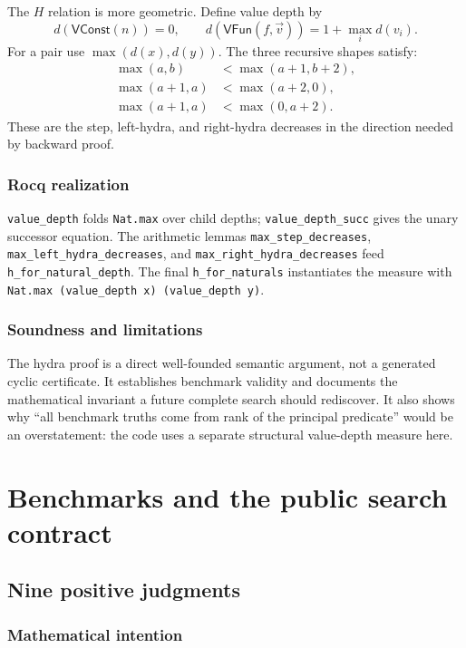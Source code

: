 \documentclass[11pt,oneside]{book}
\DeclareRobustCommand{\code}[1]{\nolinkurl{#1}}
\newcommand{\mathintent}{\subsection*{Mathematical intention}}
\newcommand{\rocqreal}{\subsection*{Rocq realization}}
\newcommand{\soundlim}{\subsection*{Soundness and limitations}}
\begin{document}
The \(H\) relation is more geometric.  Define value depth by
\[
 d(\mathsf{VConst}(n))=0,
 \qquad
 d(\mathsf{VFun}(f,\vec v))=1+\max_i d(v_i).
\]
For a pair use \(\max(d(x),d(y))\).  The three recursive shapes satisfy:
\[
\begin{aligned}
 \max(a,b)&<\max(a+1,b+2),\\
 \max(a+1,a)&<\max(a+2,0),\\
 \max(a+1,a)&<\max(0,a+2).
\end{aligned}
\]
These are the step, left-hydra, and right-hydra decreases in the direction
needed by backward proof.

\rocqreal

\code{value_depth} folds \code{Nat.max} over child depths;
\code{value_depth_succ} gives the unary successor equation.  The arithmetic
lemmas \code{max_step_decreases}, \code{max_left_hydra_decreases}, and
\code{max_right_hydra_decreases} feed
\code{h_for_natural_depth}.  The final \code{h_for_naturals} instantiates the
measure with \code{Nat.max (value_depth x) (value_depth y)}.

\soundlim

The hydra proof is a direct well-founded semantic argument, not a generated
cyclic certificate.  It establishes benchmark validity and documents the
mathematical invariant a future complete search should rediscover.  It also
shows why ``all benchmark truths come from rank of the principal predicate''
would be an overstatement: the code uses a separate structural value-depth
measure here.

\chapter{Benchmarks and the public search contract}
\label{ch:bench-search}

\section{Nine positive judgments}

\mathintent
\end{document}
